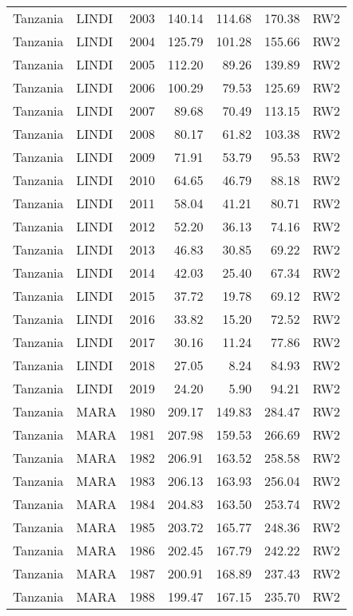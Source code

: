 \begin{longtable}{lllrrrl}
  Tanzania & LINDI & 2003 & 140.14 & 114.68 & 170.38 & RW2 \\ 
  Tanzania & LINDI & 2004 & 125.79 & 101.28 & 155.66 & RW2 \\ 
  Tanzania & LINDI & 2005 & 112.20 & 89.26 & 139.89 & RW2 \\ 
  Tanzania & LINDI & 2006 & 100.29 & 79.53 & 125.69 & RW2 \\ 
  Tanzania & LINDI & 2007 & 89.68 & 70.49 & 113.15 & RW2 \\ 
  Tanzania & LINDI & 2008 & 80.17 & 61.82 & 103.38 & RW2 \\ 
  Tanzania & LINDI & 2009 & 71.91 & 53.79 & 95.53 & RW2 \\ 
  Tanzania & LINDI & 2010 & 64.65 & 46.79 & 88.18 & RW2 \\ 
  Tanzania & LINDI & 2011 & 58.04 & 41.21 & 80.71 & RW2 \\ 
  Tanzania & LINDI & 2012 & 52.20 & 36.13 & 74.16 & RW2 \\ 
  Tanzania & LINDI & 2013 & 46.83 & 30.85 & 69.22 & RW2 \\ 
  Tanzania & LINDI & 2014 & 42.03 & 25.40 & 67.34 & RW2 \\ 
  Tanzania & LINDI & 2015 & 37.72 & 19.78 & 69.12 & RW2 \\ 
  Tanzania & LINDI & 2016 & 33.82 & 15.20 & 72.52 & RW2 \\ 
  Tanzania & LINDI & 2017 & 30.16 & 11.24 & 77.86 & RW2 \\ 
  Tanzania & LINDI & 2018 & 27.05 & 8.24 & 84.93 & RW2 \\ 
  Tanzania & LINDI & 2019 & 24.20 & 5.90 & 94.21 & RW2 \\ 
  Tanzania & MARA & 1980 & 209.17 & 149.83 & 284.47 & RW2 \\ 
  Tanzania & MARA & 1981 & 207.98 & 159.53 & 266.69 & RW2 \\ 
  Tanzania & MARA & 1982 & 206.91 & 163.52 & 258.58 & RW2 \\ 
  Tanzania & MARA & 1983 & 206.13 & 163.93 & 256.04 & RW2 \\ 
  Tanzania & MARA & 1984 & 204.83 & 163.50 & 253.74 & RW2 \\ 
  Tanzania & MARA & 1985 & 203.72 & 165.77 & 248.36 & RW2 \\ 
  Tanzania & MARA & 1986 & 202.45 & 167.79 & 242.22 & RW2 \\ 
  Tanzania & MARA & 1987 & 200.91 & 168.89 & 237.43 & RW2 \\ 
  Tanzania & MARA & 1988 & 199.47 & 167.15 & 235.70 & RW2 \\ 

\end{longtable}
